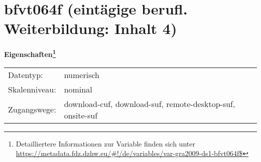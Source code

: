 
    \setcounter{footnote}{0}

    \vspace*{-1.8cm}
	\section{bfvt064f (eintägige berufl. Weiterbildung: Inhalt 4)}
	\label{section:bfvt064f}



    \vspace*{0.5cm}
    \noindent\textbf{Eigenschaften\footnote{Detailliertere Informationen zur Variable finden sich unter
		\url{https://metadata.fdz.dzhw.eu/\#!/de/variables/var-gra2009-ds1-bfvt064f$}}}\\
	\begin{tabularx}{\hsize}{@{}lX}
	Datentyp: & numerisch \\
	Skalenniveau: & nominal \\
	Zugangswege: &
	  download-cuf, 
	  download-suf, 
	  remote-desktop-suf, 
	  onsite-suf
 \\
    \end{tabularx}



